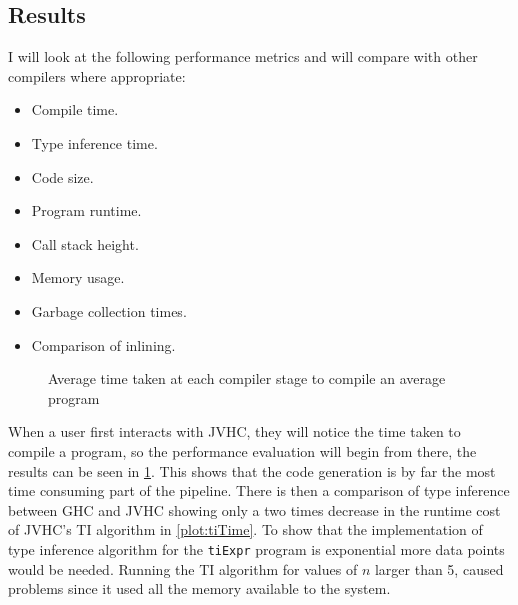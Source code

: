 \documentclass[float=false, crop=false]{standalone}
\newlength\gwidth
\newlength\gheight
\newcommand{\importMGraph}[3]{\setlength{\gwidth}{#2}\setlength{\gheight}{#3}{#1}}
\begin{document}
\subsection{Results}

I will look at the following performance metrics and will compare with other compilers where
appropriate:

\begin{itemize}
  \item Compile time.
  \item Type inference time.
  \item Code size.
  \item Program runtime.
  \item Call stack height.
  \item Memory usage.
  \item Garbage collection times.
  \item Comparison of inlining.
\end{itemize}


\begin{figure}
  \centering
      \importMGraph{plotStage.tex}{0.7\textwidth}{0.22\textwidth}
      \caption{Average time taken at each compiler stage to compile an 
      average program}
      \label{plot:TimeInStages}
\end{figure}
When a user first interacts with JVHC, they will notice the time 
taken to compile a program, so the performance evaluation will begin from there,
the results can be seen in \cref{plot:TimeInStages}. 
This shows that the code generation is by far the most time 
consuming part of the pipeline. 
There is then a comparison of type inference between GHC and JVHC 
showing only a two times decrease in the runtime cost of JVHC's TI 
algorithm in \cref{plot:tiTime}. 
To show that the implementation of
type inference algorithm for the \verb|tiExpr| program is exponential
more data points would be needed.
Running the TI algorithm for values of $n$ larger than 5,
caused problems since it used all the memory available to the system.
\end{document}
